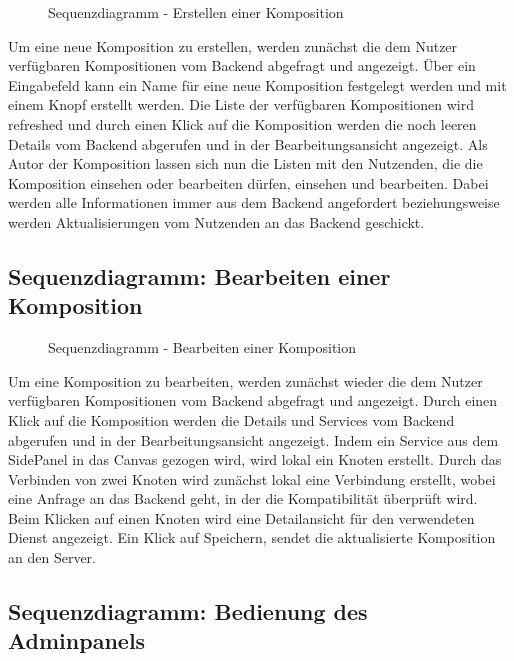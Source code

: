 \begin{figure}[h]
	\centering
	\caption{Sequenzdiagramm - Erstellen einer Komposition}
	\label{fig:sequenz-createComp}
\end{figure}
\noindent
Um eine neue Komposition zu erstellen, werden zunächst die dem Nutzer verfügbaren Kompositionen vom Backend abgefragt und angezeigt. Über ein Eingabefeld kann ein Name für eine neue Komposition festgelegt werden und mit einem Knopf erstellt werden. Die Liste der verfügbaren Kompositionen wird refreshed und durch einen Klick auf die Komposition werden die noch leeren Details vom Backend abgerufen und in der Bearbeitungsansicht angezeigt. Als Autor der Komposition lassen sich nun die Listen mit den Nutzenden, die die Komposition einsehen oder bearbeiten dürfen, einsehen und bearbeiten. Dabei werden alle Informationen immer aus dem Backend angefordert beziehungsweise werden Aktualisierungen vom Nutzenden an das Backend geschickt.

\subsection*{Sequenzdiagramm: Bearbeiten einer Komposition}

\begin{figure}[h]
	\centering
	\caption{Sequenzdiagramm - Bearbeiten einer Komposition}
	\label{fig:sequenz-editComp}
\end{figure}
\noindent
Um eine Komposition zu bearbeiten, werden zunächst wieder die dem Nutzer verfügbaren Kompositionen vom Backend abgefragt und angezeigt. Durch einen Klick auf die Komposition werden die Details und Services vom Backend abgerufen und in der Bearbeitungsansicht angezeigt. Indem ein Service aus dem SidePanel in das Canvas gezogen wird, wird lokal ein Knoten erstellt. Durch das Verbinden von zwei Knoten wird zunächst lokal eine Verbindung erstellt, wobei eine Anfrage an das Backend geht, in der die Kompatibilität überprüft wird. Beim Klicken auf einen Knoten wird eine Detailansicht für den verwendeten Dienst angezeigt. Ein Klick auf Speichern, sendet die aktualisierte Komposition an den Server.

\subsection*{Sequenzdiagramm: Bedienung des Adminpanels}

